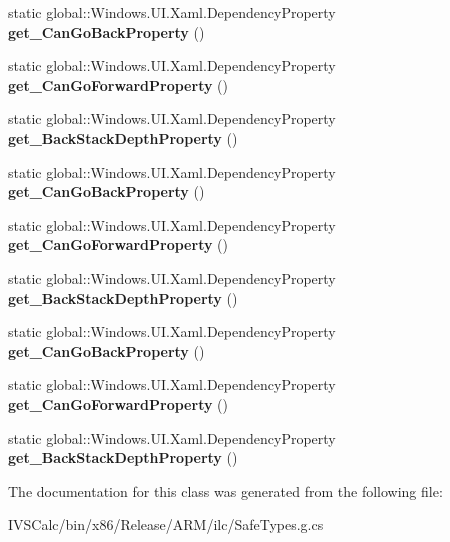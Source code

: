 \begin{DoxyCompactItemize}
static global\+::\+Windows.\+U\+I.\+Xaml.\+Dependency\+Property {\bfseries get\+\_\+\+Can\+Go\+Back\+Property} ()
\item 
\mbox{\label{class_windows_1_1_u_i_1_1_xaml_1_1_controls_1_1_frame_a3dda796c0ef8c9d00b6498a8eb185bed}} 
static global\+::\+Windows.\+U\+I.\+Xaml.\+Dependency\+Property {\bfseries get\+\_\+\+Can\+Go\+Forward\+Property} ()
\item 
\mbox{\label{class_windows_1_1_u_i_1_1_xaml_1_1_controls_1_1_frame_a4c33ec84310a13def5890e6cc1ed43ad}} 
static global\+::\+Windows.\+U\+I.\+Xaml.\+Dependency\+Property {\bfseries get\+\_\+\+Back\+Stack\+Depth\+Property} ()
\item 
\mbox{\label{class_windows_1_1_u_i_1_1_xaml_1_1_controls_1_1_frame_a74bc4908ceb332506d52e29fe6abdd27}} 
static global\+::\+Windows.\+U\+I.\+Xaml.\+Dependency\+Property {\bfseries get\+\_\+\+Can\+Go\+Back\+Property} ()
\item 
\mbox{\label{class_windows_1_1_u_i_1_1_xaml_1_1_controls_1_1_frame_a3dda796c0ef8c9d00b6498a8eb185bed}} 
static global\+::\+Windows.\+U\+I.\+Xaml.\+Dependency\+Property {\bfseries get\+\_\+\+Can\+Go\+Forward\+Property} ()
\item 
\mbox{\label{class_windows_1_1_u_i_1_1_xaml_1_1_controls_1_1_frame_a4c33ec84310a13def5890e6cc1ed43ad}} 
static global\+::\+Windows.\+U\+I.\+Xaml.\+Dependency\+Property {\bfseries get\+\_\+\+Back\+Stack\+Depth\+Property} ()
\item 
\mbox{\label{class_windows_1_1_u_i_1_1_xaml_1_1_controls_1_1_frame_a74bc4908ceb332506d52e29fe6abdd27}} 
static global\+::\+Windows.\+U\+I.\+Xaml.\+Dependency\+Property {\bfseries get\+\_\+\+Can\+Go\+Back\+Property} ()
\item 
\mbox{\label{class_windows_1_1_u_i_1_1_xaml_1_1_controls_1_1_frame_a3dda796c0ef8c9d00b6498a8eb185bed}} 
static global\+::\+Windows.\+U\+I.\+Xaml.\+Dependency\+Property {\bfseries get\+\_\+\+Can\+Go\+Forward\+Property} ()
\item 
\mbox{\label{class_windows_1_1_u_i_1_1_xaml_1_1_controls_1_1_frame_a4c33ec84310a13def5890e6cc1ed43ad}} 
static global\+::\+Windows.\+U\+I.\+Xaml.\+Dependency\+Property {\bfseries get\+\_\+\+Back\+Stack\+Depth\+Property} ()
\end{DoxyCompactItemize}


The documentation for this class was generated from the following file\+:\begin{DoxyCompactItemize}
\item 
I\+V\+S\+Calc/bin/x86/\+Release/\+A\+R\+M/ilc/Safe\+Types.\+g.\+cs\end{DoxyCompactItemize}

